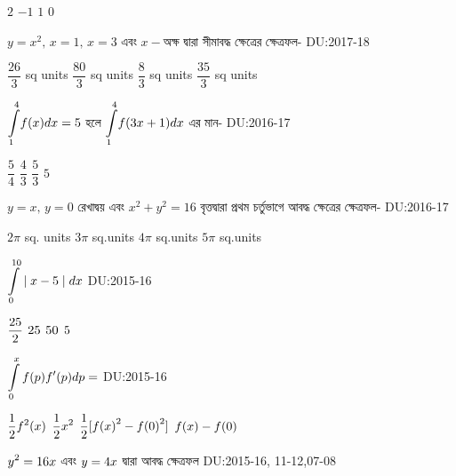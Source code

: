 \documentclass[addpoints]{exam}
\begin{document}
\begin{questions}
\begin{oneparchoices}
\choice $ 2 $
\choice $ -1 $
\choice $ 1 $
\choice $ 0 $

\end{oneparchoices}

\question $ y=x^2,\,x=1,\,x=3 $ এবং $ x- $অক্ষ দ্বারা সীমাবদ্ধ ক্ষেত্রের ক্ষেত্রফল-   \hfill \textsc{DU:2017-18}

\begin{oneparchoices}
\choice $ \dfrac{26}{3} $ sq units
\choice $ \dfrac{80}{3} $ sq units
\choice $ \dfrac{8}{3} $ sq units
\choice $ \dfrac{35}{3} $ sq units
\end{oneparchoices}

\question   $ \mathlarger{\int\limits_{1}^{4}} f(x)dx=5$ হলে $ \mathlarger{\int\limits_{1}^{4}} f(3x+1)dx$ এর মান- \hfill \textsc{DU:2016-17}

\begin{oneparchoices}
\choice $\dfrac{5}{4}$
\choice $ \dfrac{4}{3} $
\choice $ \dfrac{5}{3} $
\choice $ 5 $

\end{oneparchoices}

\question   $ y=x,\, y=0 $ রেখাদ্বয় এবং $ x^2 + y^2 =16 $ বৃত্তদ্বারা প্রথম চর্তুভাগে আবদ্ধ ক্ষেত্রের ক্ষেত্রফল- \hfill \textsc{DU:2016-17}

\begin{oneparchoices}
\choice $ 2\pi$ sq. units
\choice $ 3\pi $ sq.units
\choice $ 4\pi $ sq.units
\choice $ 5\pi $ sq.units
\end{oneparchoices}

\question  $\mathlarger{\int\limits_{0}^{10} \mid  x-5 \mid dx}$   \hfill \textsc{DU:2015-16}

\begin{oneparchoices}
 \choice $\mathlarger{\frac{25}{2}}$
 \choice $\mathlarger{25}$
 \choice $\mathlarger{50}$
 \choice $\mathlarger{5}$
\end{oneparchoices}

\question $\mathlarger{\int\limits_{0}^{x} f(p) f^{\prime} (p)dp}=$ \hfill \textsc{DU:2015-16}

\begin{oneparchoices}
 \choice $\mathlarger{\frac{1}{2} f^{2}(x)}$
\choice $\mathlarger{\frac{1}{2} x^2}$
 \choice $\mathlarger{\frac{1}{2}[{f(x)}^{2}-{f(0)}^{2}]}$
 \choice $\mathlarger{f(x)-f(0)}$
\end{oneparchoices}

\question  $\mathlarger{y^2=16x}$  এবং  $\mathlarger{y=4x}$ দ্বারা আবদ্ধ ক্ষেত্রফল \hfill \textsc{DU:2015-16, 11-12,07-08}


\end{questions}
\end{document}
